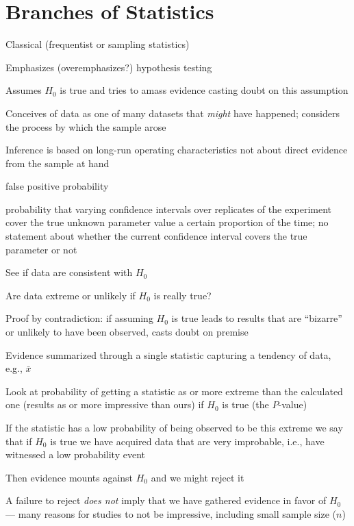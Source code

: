 \section{Branches of Statistics}
\bi
\item Classical (frequentist or sampling statistics)
 \bi
  \item Emphasizes (overemphasizes?) hypothesis testing
 \item Assumes $H_{0}$ is true and tries to amass evidence casting
   doubt on this assumption
 \item Conceives of data as one of many datasets that \emph{might} have
   happened; considers the process by which the sample arose
 \item Inference is based on long-run operating characteristics not
   about direct evidence from the sample at hand
   \bi
   \item false positive probability
   \item probability that varying confidence intervals over replicates
     of the experiment cover the true unknown parameter value a
     certain proportion of the time; no statement about whether the
     current confidence interval covers the true parameter or not
   \ei
 \item See if data are consistent with $H_{0}$
 \item Are data extreme or unlikely if $H_{0}$ is really true?
 \item Proof by contradiction: if assuming $H_{0}$ is true leads to
   results that are ``bizarre'' or unlikely to have been observed,
   casts doubt on premise
 \item Evidence summarized through a single statistic capturing a
   tendency of data, e.g., $\bar{x}$
 \item Look at probability of getting a statistic as or more extreme
   than the calculated one (results as or more impressive than ours)
   if $H_{0}$ is true (the $P$-value)
 \item If the statistic has a low probability of being observed to be
   this extreme we say
   that if $H_{0}$ is true we have acquired data that are very
   improbable, i.e., have witnessed a low probability event
 \item Then evidence mounts against $H_{0}$ and we might reject it
 \item A failure to reject \emph{does not} imply that we have gathered
   evidence in favor of $H_0$ --- many reasons for studies to not
   be impressive, including small sample size ($n$)
